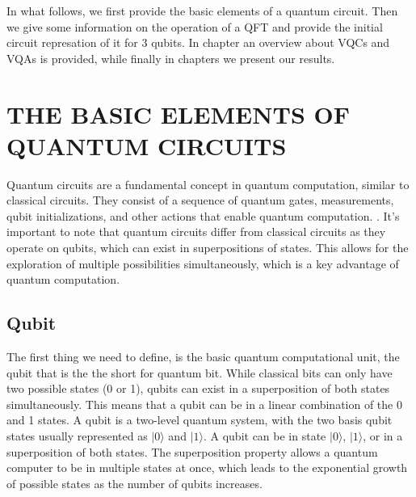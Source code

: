 \documentclass[inscr,ack,preface]{diphdthesis}
\begin{document}
 In what follows, we first provide the basic elements of a quantum circuit. Then we give some information on
the operation of a QFT and provide the initial circuit represation of it for $3$ qubits. In chapter an overview about
VQCs and VQAs is provided, while finally in chapters we present our results.

\chapter{THE BASIC ELEMENTS OF QUANTUM CIRCUITS}

Quantum circuits are a fundamental concept in quantum computation, similar to classical circuits. They consist of a sequence of quantum gates, measurements, qubit initializations, and other actions that enable quantum computation. \cite{niel}. It's important to note that quantum circuits differ from classical circuits as they operate on qubits, which can exist in superpositions of states. This allows for the exploration of multiple possibilities simultaneously, which is a key advantage of quantum computation. 

\section{Qubit}

The first thing we need to define, is the basic quantum computational unit, the qubit that is the the short for quantum bit. 
 While classical bits can only have two possible states (0 or 1), qubits can exist in a superposition of both states simultaneously. This means that a qubit can be in a linear combination of the 0 and 1 states. A qubit is a two-level quantum system, with the two basis qubit states usually represented as $\vert0\rangle$ and $\vert1\rangle$. A qubit can be in state $\vert0\rangle$, $\vert1\rangle$, or in a superposition of both states. The superposition property allows a quantum computer to be in multiple states at once, which leads to the exponential growth of possible states as the number of qubits increases.\cite{qubit}
 
\end{document}
